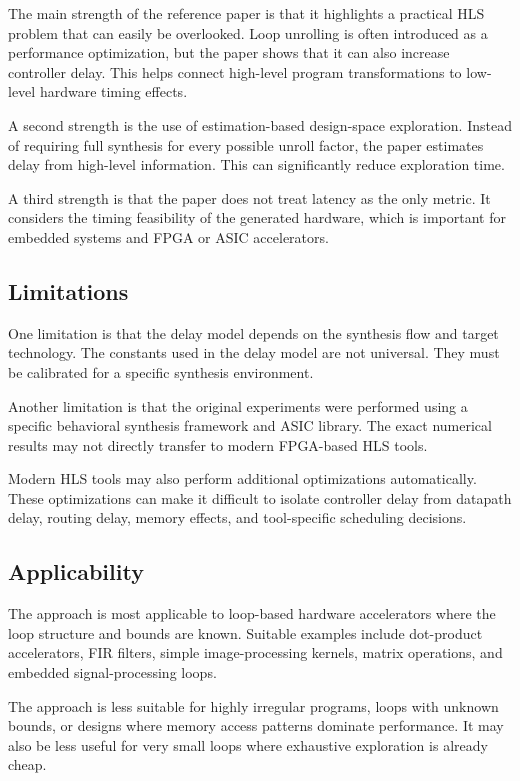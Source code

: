 \documentclass[conference]{IEEEtran}
\begin{document}
The main strength of the reference paper is that it highlights a practical HLS problem that can easily be overlooked. Loop unrolling is often introduced as a performance optimization, but the paper shows that it can also increase controller delay. This helps connect high-level program transformations to low-level hardware timing effects.

A second strength is the use of estimation-based design-space exploration. Instead of requiring full synthesis for every possible unroll factor, the paper estimates delay from high-level information. This can significantly reduce exploration time.

A third strength is that the paper does not treat latency as the only metric. It considers the timing feasibility of the generated hardware, which is important for embedded systems and FPGA or ASIC accelerators.

\subsection{Limitations}

One limitation is that the delay model depends on the synthesis flow and target technology. The constants used in the delay model are not universal. They must be calibrated for a specific synthesis environment.

Another limitation is that the original experiments were performed using a specific behavioral synthesis framework and ASIC library. The exact numerical results may not directly transfer to modern FPGA-based HLS tools.

Modern HLS tools may also perform additional optimizations automatically. These optimizations can make it difficult to isolate controller delay from datapath delay, routing delay, memory effects, and tool-specific scheduling decisions.

\subsection{Applicability}

The approach is most applicable to loop-based hardware accelerators where the loop structure and bounds are known. Suitable examples include dot-product accelerators, FIR filters, simple image-processing kernels, matrix operations, and embedded signal-processing loops.

The approach is less suitable for highly irregular programs, loops with unknown bounds, or designs where memory access patterns dominate performance. It may also be less useful for very small loops where exhaustive exploration is already cheap.
\end{document}
